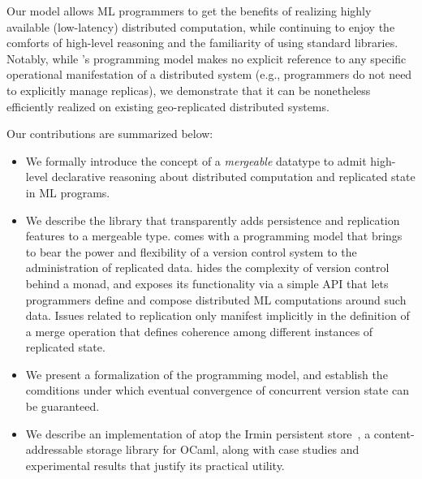 Our model allows ML programmers to get the benefits of realizing
highly available (low-latency) distributed computation, while
continuing to enjoy the comforts of high-level reasoning and the
familiarity of using standard libraries.  Notably, while \name's
programming model makes no explicit reference to any specific
operational manifestation of a distributed system (e.g., programmers
do not need to explicitly manage replicas), we demonstrate that it can
be nonetheless efficiently realized on existing geo-replicated
distributed systems.

Our contributions are summarized below:

\begin{itemize}
    \item We formally introduce the concept of a \emph{mergeable}
      datatype to admit high-level declarative reasoning about
      distributed computation and replicated state in ML programs.

    \item We describe the \name library that transparently adds
      persistence and replication features to a mergeable type. \name
      comes with a programming model that brings to bear the power and
      flexibility of a version control system to the administration of
      replicated data. \name hides the complexity of version control
      behind a monad, and exposes its functionality via a simple API
      that lets programmers define and compose distributed ML
      computations around such data.  Issues related to replication
      only manifest implicitly in the definition of a merge operation
      that defines coherence among different instances of replicated
      state.

    \item We present a formalization of the \name programming model,
      and establish the comditions under which eventual convergence of
      concurrent version state can be guaranteed.

    \item We describe an implementation of \name atop the Irmin
      persistent store~\cite{irmin}, a content-addressable storage
      library for OCaml, along with case studies and experimental
      results that justify its practical utility.
\end{itemize}



